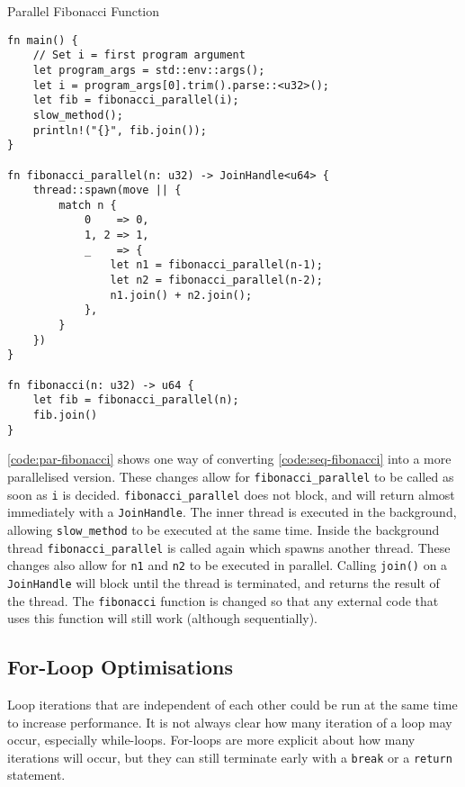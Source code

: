 \documentclass[conference]{IEEEtran}
\begin{document}
\begin{algorithm}
\caption{Parallel Fibonacci Function}
\label{code:par-fibonacci}
\begin{verbatim}
fn main() {
    // Set i = first program argument
    let program_args = std::env::args();
    let i = program_args[0].trim().parse::<u32>();
    let fib = fibonacci_parallel(i);
    slow_method();
    println!("{}", fib.join());
}

fn fibonacci_parallel(n: u32) -> JoinHandle<u64> {
    thread::spawn(move || {
        match n {
            0    => 0,
            1, 2 => 1,
            _    => {
                let n1 = fibonacci_parallel(n-1);
                let n2 = fibonacci_parallel(n-2);
                n1.join() + n2.join();
            },
        }
    })
}

fn fibonacci(n: u32) -> u64 {
    let fib = fibonacci_parallel(n);
    fib.join()
}
\end{verbatim}
\end{algorithm}

\autoref{code:par-fibonacci} shows one way of converting \autoref{code:seq-fibonacci} into a more parallelised version. These changes allow for \texttt{fibonacci\_parallel} to be called as soon as \texttt{i} is decided. \texttt{fibonacci\_parallel} does not block, and will return almost immediately with a \texttt{JoinHandle}. The inner thread is executed in the background, allowing \texttt{slow\_method} to be executed at the same time. Inside the background thread \texttt{fibonacci\_parallel} is called again which spawns another thread.
These changes also allow for \texttt{n1} and \texttt{n2} to be executed in parallel. Calling \texttt{join()} on a \texttt{JoinHandle} will block until the thread is terminated, and returns the result of the thread. The \texttt{fibonacci} function is changed so that any external code that uses this function will still work (although sequentially).

\subsection{For-Loop Optimisations}
Loop iterations that are independent of each other could be run at the same time to increase performance. It is not always clear how many iteration of a loop may occur, especially while-loops. For-loops are more explicit about how many iterations will occur, but they can still terminate early with a \texttt{break} or a \texttt{return} statement.
\end{document}
